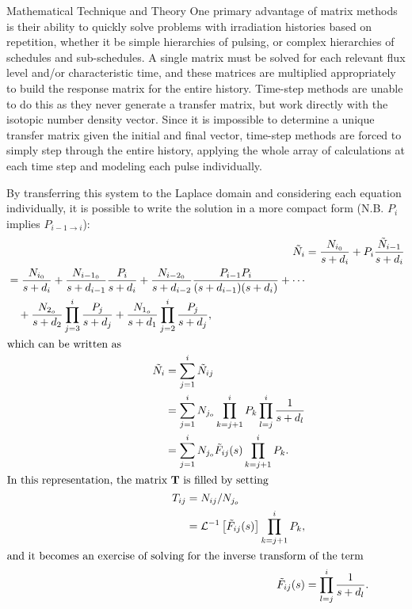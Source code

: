 \begin{chapter}{Mathematical Technique and Theory\label{chap:math}}
  One primary advantage of matrix methods is their ability to quickly
  solve problems with irradiation histories based on repetition,
  whether it be simple hierarchies of pulsing, or complex hierarchies
  of schedules and sub-schedules.  A single matrix must be solved for
  each relevant flux level and/or characteristic time, and these
  matrices are multiplied appropriately to build the response matrix
  for the entire history.  Time-step methods are unable to do this as
  they never generate a transfer matrix, but work directly with the
  isotopic number density vector.  Since it is impossible to
  determine a unique transfer matrix given the initial and final
  vector, time-step methods are forced to simply step through the
  entire history, applying the whole array of calculations at each
  time step and modeling each pulse individually.
  
  By transferring this system to the Laplace domain and considering
  each equation individually, it is possible to write the solution in
  a more compact form (N.B. $P_{i}$ implies $P_{i-1 \rightarrow i}$):
  \begin{align}
    \tilde{N}_i &= \frac{N_{i_0}}{s+d_i} + P_i
    \frac{\tilde{N}_{i-1}}{s+d_i}\\
    \begin{split}
      &= \frac{N_{i_0}}{s+d_i} + 
      \frac{N_{i-1_0}}{s+d_{i-1}}\frac{P_i}{s+d_i} +
      \frac{N_{i-2_0}}{s+d_{i-2}}\frac{P_{i-1}P_i}{(s+d_{i-1})(s+d_i)} + 
      \cdots\\
      &\quad+\frac{N_{2_o}}{s+d_2}\prod_{j=3}^i\frac{P_{j}}{s+d_{j}} +
      \frac{N_{1_o}}{s+d_1}\prod_{j=2}^i\frac{P_j}{s+d_{j}},\\
    \end{split}\\
    \intertext{which can be written as}
    \begin{split}
      \tilde{N}_i & = \sum_{j=1}^i \tilde{N}_{ij} \\
      & = \sum_{j=1}^i N_{j_o} \prod_{k=j+1}^i P_k \prod_{l=j}^i
      \frac{1}{s+d_l} \\
      & = \sum_{j=1}^i N_{j_o} \tilde{F}_{ij}(s)
      \prod_{k=j+1}^i P_k.\label{eq:math.full.prob}\\
    \end{split}\\
    \intertext{In this representation, the matrix \mbox{$\mathbf{T}$} is filled by setting}
    \begin{split}
      T_{ij} &= N_{ij}/N_{j_o}\\ &=
      \mathcal{L}^{-1}\left[\tilde{F}_{ij}(s)\right] \prod_{k=j+1}^{i}
      P_k,\\
    \end{split}\label{eq:math.intro.filler}\\
    \intertext{and it becomes an exercise of solving for the inverse
      transform of the term}
    \tilde{F}_{ij}(s) &= \prod_{l=j}^i \frac{1}{s+d_l}\label{eq:math.root.prob}.
  \end{align}
  

\end{chapter}
